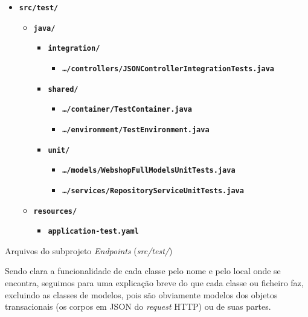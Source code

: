 \begin{table}[!hbt]
\begin{itemize}
  \item \texttt{\textbf{src/test/}}\begin{itemize}
          \item \texttt{\textbf{java/}}\begin{itemize}
                  \item \texttt{\textbf{integration/}}\begin{itemize}
                          \item \texttt{\textbf{\ldots/controllers/JSONControllerIntegrationTests.java}}
                        \end{itemize}
                  \item \texttt{\textbf{shared/}}\begin{itemize}
                          \item \texttt{\textbf{\ldots/container/TestContainer.java}}
                          \item \texttt{\textbf{\ldots/environment/TestEnvironment.java}}
                        \end{itemize}
                  \item \texttt{\textbf{unit/}}\begin{itemize}
                          \item \texttt{\textbf{\ldots/models/WebshopFullModelsUnitTests.java}}
                          \item \texttt{\textbf{\ldots/services/RepositoryServiceUnitTests.java}}
                        \end{itemize}
                \end{itemize}
          \item \texttt{\textbf{resources/}}\begin{itemize}
                  \item \texttt{\textbf{application-test.yaml}}
                \end{itemize}
        \end{itemize}
\end{itemize}
\label{tab:endp2}
\caption{Arquivos do subprojeto \textit{Endpoints} (\textit{src/test/})}
\end{table}
\FloatBarrier

Sendo clara a funcionalidade de cada classe pelo nome e pelo local onde se encontra, seguimos para uma explicação breve do que cada classe ou ficheiro faz, excluindo as classes de modelos, pois são obviamente modelos dos objetos transacionais (os corpos em JSON do \textit{request} HTTP) ou de suas partes.

